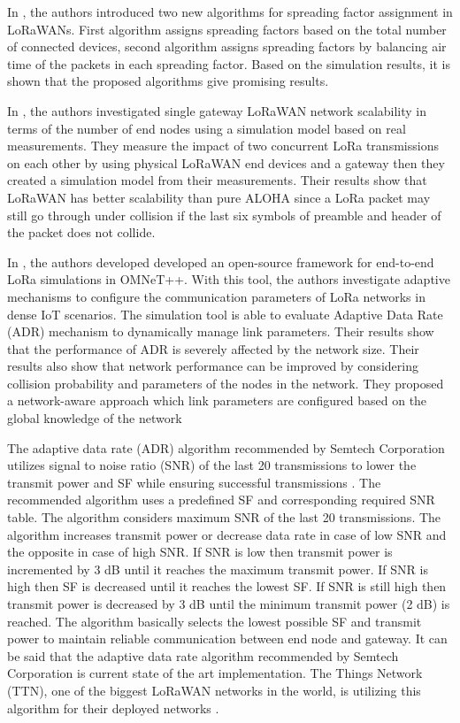 In \cite{8115779}, the authors introduced two new algorithms for spreading factor assignment in LoRaWANs. First algorithm assigns spreading factors based on the total number of connected devices, second algorithm assigns spreading factors by balancing air time of the packets in each spreading factor. Based on the simulation results, it is shown that the proposed algorithms give promising results.

In \cite{s17061193}, the authors investigated single gateway LoRaWAN network scalability in terms of the number of end nodes using a simulation model based on real measurements. They measure the impact of two concurrent LoRa transmissions on each other by using physical LoRaWAN end devices and a gateway then they created a simulation model from their measurements. Their results show that LoRaWAN has better scalability than pure ALOHA since a LoRa packet may still go through under collision if the last six symbols of preamble and header of the packet does not collide.

In \cite{8406255}, the authors developed developed an open-source framework for end-to-end LoRa simulations in OMNeT++. With this tool, the authors investigate adaptive mechanisms to configure the communication parameters of LoRa networks in dense IoT scenarios. The simulation tool is able to evaluate Adaptive Data Rate (ADR) mechanism to dynamically manage link parameters. Their results show that the performance of ADR is severely affected by the network size. Their results also show that network performance can be improved by considering collision probability and  parameters of the nodes in the network. They proposed a network-aware approach which link parameters are configured based on the global knowledge of the network

The adaptive data rate (ADR) algorithm recommended by Semtech Corporation utilizes signal to noise ratio (SNR) of the last 20 transmissions to lower the transmit power and SF while ensuring successful transmissions \cite{lorawan_adr}. The recommended algorithm uses a predefined SF and corresponding required SNR table. The algorithm considers maximum SNR of the last 20 transmissions. The algorithm increases transmit power or decrease data rate in case of low SNR and the opposite in case of high SNR. If SNR is low then transmit power is incremented by 3 dB until it reaches the maximum transmit power. If SNR is high then SF is decreased until it reaches the lowest SF. If SNR is still high then transmit power is decreased by 3 dB until the minimum transmit power (2 dB) is reached. The algorithm basically selects the lowest possible SF and transmit power to maintain reliable communication between end node and gateway. It can be said that the adaptive data rate algorithm recommended by Semtech Corporation is current state of the art implementation. The Things Network (TTN), one of the biggest LoRaWAN networks in the world, is utilizing this algorithm for their deployed networks \cite{ttn_adr}.

